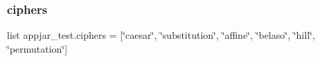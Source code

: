 \subsubsection{\texorpdfstring{ciphers}{ciphers}}
{\footnotesize\ttfamily list appjar\+\_\+test.\+ciphers = \mbox{[}\char`\"{}caesar\char`\"{}, \char`\"{}substitution\char`\"{}, \char`\"{}affine\char`\"{}, \char`\"{}belaso\char`\"{}, \char`\"{}hill\char`\"{}, \char`\"{}permutation\char`\"{}\mbox{]}}

